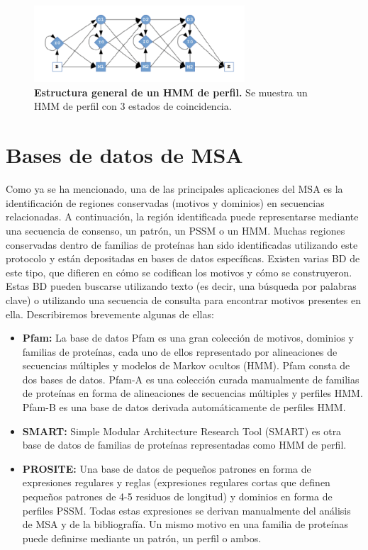 \begin{figure}[htbp]
\centering
\includegraphics[width = 0.7\textwidth]{figs/general-hmm.png}
\caption{\textbf{Estructura general de un HMM de perfil.} Se muestra un HMM de perfil con 3 estados de coincidencia.}
\label{fig:gen-hmm}
\end{figure}

\section{Bases de datos de MSA}
Como ya se ha mencionado, una de las principales aplicaciones del MSA es la identificación de regiones conservadas (motivos y dominios) en secuencias relacionadas. A continuación, la región identificada puede representarse mediante una secuencia de consenso, un patrón, un PSSM o un HMM. Muchas regiones conservadas dentro de familias de proteínas han sido identificadas utilizando este protocolo y están depositadas en bases de datos específicas. Existen varias BD de este tipo, que difieren en cómo se codifican los motivos y cómo se construyeron. Estas BD pueden buscarse utilizando texto (es decir, una búsqueda por palabras clave) o utilizando una secuencia de consulta para encontrar motivos presentes en ella. Describiremos brevemente algunas de ellas:
\begin{itemize}
\item \textbf{Pfam:} La base de datos Pfam es una gran colección de motivos, dominios y familias de proteínas, cada uno de ellos representado por alineaciones de secuencias múltiples y modelos de Markov ocultos (HMM). Pfam consta de dos bases de datos. Pfam-A es una colección curada manualmente de familias de proteínas en forma de alineaciones de secuencias múltiples y perfiles HMM. Pfam-B es una base de datos derivada automáticamente de perfiles HMM.
\item \textbf{SMART:} Simple Modular Architecture Research Tool (SMART) es otra base de datos de familias de proteínas representadas como HMM de perfil.
\item \textbf{PROSITE:} Una base de datos de pequeños patrones en forma de expresiones regulares y reglas (expresiones regulares cortas que definen pequeños patrones de 4-5 residuos de longitud) y dominios en forma de perfiles PSSM. Todas estas expresiones se derivan manualmente del análisis de MSA y de la bibliografía. Un mismo motivo en una familia de proteínas puede definirse mediante un patrón, un perfil o ambos.
\end{itemize}

